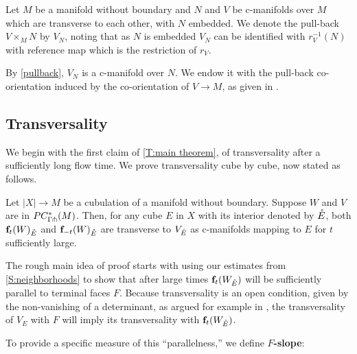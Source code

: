 \begin{definition}
	Let $M$ be a manifold without boundary and $N$ and $V$ be c-manifolds over $M$ which are transverse to each
	other,  with $N$ embedded.
	We  denote the pull-back $V \times_M N$ by $V_N$, noting that as $N$ is embedded $V_N$ can be identified with $r_V^{-1}(N)$ with  reference map which  is the restriction of $r_V$. %

	By \cref{pullback}, $V_N$ is a c-manifold over $N$.  We endow it with the pull-back co-orientation induced by the co-orientation of $V\to M$,  as given in  \cite[Sections 3.5.1 and 3.5.2]{medina2022foundations}. %
\end{definition}

\subsection{Transversality}

We begin with the first claim of \cref{T:main theorem}, of transversality after a sufficiently long flow time.
We prove transversality cube by cube, now stated as follows.



\begin{theorem}\label{T:transversality}
	Let $|X| \to M$ be a cubulation of a manifold without boundary.
	Suppose $W$ and $V$ are in $PC_{\Gamma \pitchfork}^*(M)$.
	Then, for any cube $E$ in $X$ with its interior denoted by $\mathring{E}$, both $\mathbf{f}_t(W)_{\mathring{E}}$ and $\mathbf{f}_{-t}(W)_{\mathring{E}}$ are transverse to $V_{\mathring{E}}$ as c-manifolds mapping to $E$  for $t$ sufficiently large.
\end{theorem}


The rough main idea of proof starts with using our estimates from \cref{S:neighborhoods} to show that after large times $\mathbf{f}_t(W_{\mathring{E}})$ will be sufficiently parallel to terminal faces $F$.
Because transversality is an open condition, given by the non-vanishing of a determinant, as argued for example in \cite[Section 1.6]{GuPo74}, the transversality of $V_{E}$ with $F$ will imply its transversality with $\mathbf{f}_t(W_{\mathring{E}})$.


 To provide a specific measure of this ``parallelness,'' we define {\bf $F$-slope}:

